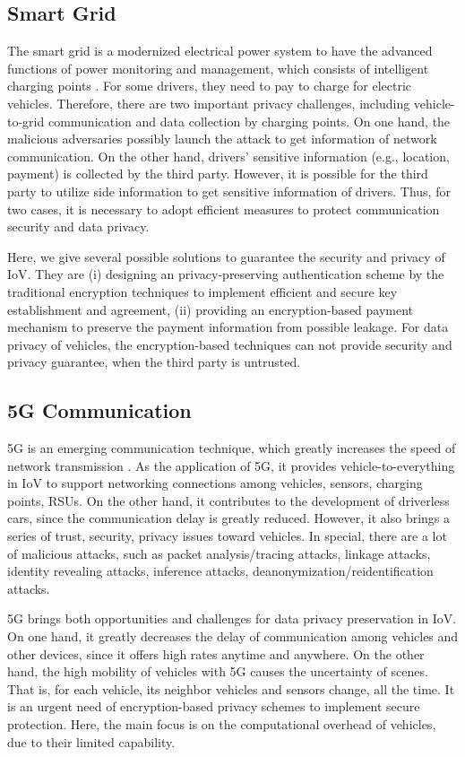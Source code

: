\documentclass[journal,transmag,11pt]{IEEEtran}
\begin{document}
\subsection{Smart Grid}
The smart grid is a modernized electrical power system to have the advanced functions of power monitoring and management, which consists of intelligent charging points \cite{journals/tits/RigasRB15}. For some drivers, they need to pay to charge for electric vehicles. Therefore, there are two important privacy challenges, including vehicle-to-grid communication and data collection by charging points. On one hand, the malicious adversaries possibly launch the attack to get information of network communication. On the other hand, drivers' sensitive information (e.g., location, payment) is collected by the third party. However, it is possible for the third party to utilize side information to get sensitive information of drivers. Thus, for two cases, it is necessary to adopt efficient measures to protect communication security and data privacy.

Here, we give several possible solutions to guarantee the security and privacy of IoV. They are (i) designing an privacy-preserving authentication scheme by the traditional encryption techniques to implement efficient and secure key establishment and agreement, (ii) providing an encryption-based payment mechanism to preserve the payment information from possible leakage. For data privacy of vehicles, the encryption-based techniques can not provide security and privacy guarantee, when the third party is untrusted.

\subsection{5G Communication}
5G is an emerging communication technique, which greatly increases the speed of network transmission \cite{journals/pieee/LuZNF20}. As the application of 5G, it provides vehicle-to-everything in IoV to support networking connections among vehicles, sensors, charging points, RSUs. On the other hand, it contributes to the development of driverless cars, since the communication delay is greatly reduced. However, it also brings a series of trust, security, privacy issues toward vehicles. In special, there are a lot of malicious attacks, such as packet analysis/tracing attacks, linkage attacks, identity revealing attacks, inference attacks, deanonymization/reidentification attacks.

5G brings both opportunities and challenges for data privacy preservation in IoV. On one hand, it greatly decreases the delay of communication among vehicles and other devices, since it offers high rates anytime and anywhere. On the other hand, the high mobility of vehicles with 5G causes the uncertainty of scenes. That is, for each vehicle, its neighbor vehicles and sensors change, all the time. It is an urgent need of encryption-based privacy schemes to implement secure protection. Here, the main focus is on the computational overhead of vehicles, due to their limited capability.
\end{document}
